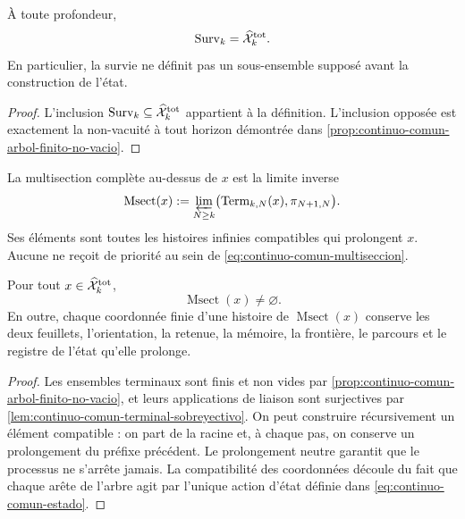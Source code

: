 \begin{theorem}
\label{thm:continuo-comun-total-superviviente}
À toute profondeur,
\begin{equation}
\label{eq:continuo-comun-surv-igual-total}
 \operatorname{Surv}_k=\widehat{\mathcal X}^{\rm tot}_k.
\end{equation}
En particulier, la survie ne définit pas un sous-ensemble supposé avant la construction de l'état.
\end{theorem}

\begin{proof}
L'inclusion \(\operatorname{Surv}_k\subseteq
\widehat{\mathcal X}^{\rm tot}_k\) appartient à la définition. L'inclusion opposée est exactement la non-vacuité à tout horizon démontrée dans \cref{prop:continuo-comun-arbol-finito-no-vacio}.
\end{proof}

\begin{definition}
\label{def:continuo-comun-multiseccion}
La multisection complète au-dessus de \(x\) est la limite inverse
\begin{equation}
\label{eq:continuo-comun-multiseccion}
 \operatorname{Msect}(x)
 :=\varprojlim_{N\geq k}
 \bigl(\operatorname{Term}_{k,N}(x),\pi_{N+1,N}\bigr).
\end{equation}
Ses éléments sont toutes les histoires infinies compatibles qui prolongent \(x\). Aucune ne reçoit de priorité au sein de \eqref{eq:continuo-comun-multiseccion}.
\end{definition}

\begin{theorem}
\label{thm:continuo-comun-multiseccion-no-vacia}
Pour tout \(x\in\widehat{\mathcal X}^{\rm tot}_k\),
\begin{equation}
\label{eq:continuo-comun-multiseccion-no-vacia}
 \operatorname{Msect}(x)\neq\varnothing.
\end{equation}
En outre, chaque coordonnée finie d'une histoire de \(\operatorname{Msect}(x)\) conserve les deux feuillets, l'orientation, la retenue, la mémoire, la frontière, le parcours et le registre de l'état qu'elle prolonge.
\end{theorem}

\begin{proof}
Les ensembles terminaux sont finis et non vides par \cref{prop:continuo-comun-arbol-finito-no-vacio}, et leurs applications de liaison sont surjectives par \cref{lem:continuo-comun-terminal-sobreyectivo}. On peut construire récursivement un élément compatible : on part de la racine et, à chaque pas, on conserve un prolongement du préfixe précédent. Le prolongement neutre garantit que le processus ne s'arrête jamais. La compatibilité des coordonnées découle du fait que chaque arête de l'arbre agit par l'unique action d'état définie dans \eqref{eq:continuo-comun-estado}.
\end{proof}

